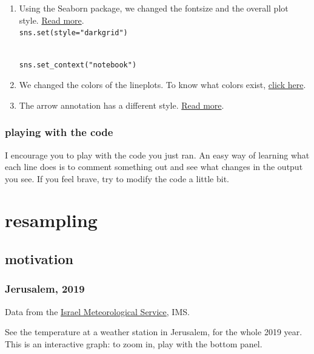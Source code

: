 \documentclass[
  letterpaper,
  DIV=11,
  numbers=noendperiod,
  oneside]{scrreprt}
\providecommand{\tightlist}{%
  \setlength{\itemsep}{0pt}\setlength{\parskip}{0pt}}\usepackage{longtable,booktabs,array}
\begin{document}
\begin{enumerate}
\def\labelenumi{\arabic{enumi}.}
\tightlist
\item
  Using the Seaborn package, we changed the fontsize and the overall
  plot style.
  \href{https://seaborn.pydata.org/tutorial/aesthetics.html}{Read
  more}.\\
  \texttt{sns.set(style="darkgrid")}\strut \\
  \texttt{sns.set\_context("notebook")}
\item
  We changed the colors of the lineplots. To know what colors exist,
  \href{https://matplotlib.org/stable/gallery/color/named_colors.html}{click
  here}.
\item
  The arrow annotation has a different style.
  \href{https://jakevdp.github.io/PythonDataScienceHandbook/04.09-text-and-annotation.html\#Arrows-and-Annotation}{Read
  more}.
\end{enumerate}

\hypertarget{playing-with-the-code}{%
\section{playing with the code}\label{playing-with-the-code}}

I encourage you to play with the code you just ran. An easy way of
learning what each line does is to comment something out and see what
changes in the output you see. If you feel brave, try to modify the code
a little bit.

\part{resampling}

\hypertarget{motivation}{%
\chapter{motivation}\label{motivation}}

\hypertarget{jerusalem-2019}{%
\section{Jerusalem, 2019}\label{jerusalem-2019}}

Data from the \href{https://ims.gov.il/en/data_gov}{Israel
Meteorological Service}, IMS.

See the temperature at a weather station in Jerusalem, for the whole
2019 year. This is an interactive graph: to zoom in, play with the
bottom panel.
\end{document}
